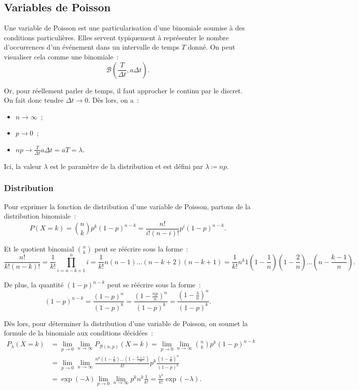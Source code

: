 \documentclass{article}
\begin{document}
	\subsection{Variables de Poisson}
		Une variable de Poisson est une particularisation d'une binomiale soumise à des conditions particulières. Elles servent typiquement à représenter le nombre
		d'occurrences d'un événement dans un intervalle de temps $T$ donné. On peut visualiser cela comme une binomiale~:
		\[\mathcal B(\frac T{\Delta t}, a\Delta t).\]

		Or, pour réellement parler de temps, il faut approcher le continu par le discret. On fait donc tendre $\Delta t \to 0$. Dès lors, on a~:
		\begin{itemize}
			\item $n \to \infty$~;
			\item $p \to 0$~;
			\item $np \to \frac T{\Delta t}a\Delta t = aT = \lambda$.
		\end{itemize}

		Ici, la valeur $\lambda$ est le paramètre de la distribution et est défini par $\lambda \coloneqq np$.

		\subsubsection{Distribution}
			Pour exprimer la fonction de distribution d'une variable de Poisson, partons de la distribution binomiale~:
			\[P(X=k) = \binom nkp^k(1-p)^{n-k} = \frac {n!}{i!(n-i)!}p^i(1-p)^{n-k}.\]

			Et le quotient binomial $\binom nk$ peut se réécrire sous la forme~:
			\[\frac {n!}{k!(n-k)!} = \frac 1{k!}\prod_{i=n-k+1}^ni = \frac 1{k!}n(n-1)\ldots(n-k+2)(n-k+1)
				= \frac 1{k!}n^k1(1-\frac 1n)(1-\frac 2n)\ldots(n-\frac {k-1}n).\]

			De plus, la quantité $(1-p)^{n-k}$ peut se réécrire sous la forme~:
			\[(1-p)^{n-k} = \frac {(1-p)^n}{(1-p)^k} = \frac {(1-\frac {np}n)^n}{(1-p)^k} = \frac {(1-\frac \lambda n)^n}{(1-p)^k}.\]

			Dès lors, pour déterminer la distribution d'une variable de Poisson, on soumet la formule de la binomiale aux conditions décidées~:
			\begin{align*}
				P_\lambda(X=k) &= \lim_{p \to 0}\lim_{n\to\infty}P_{\mathcal B(n, p)}(X=k) = \lim_{p \to 0}\lim_{n \to \infty}\binom nkp^k(1-p)^{n-k} \\
				&= \lim_{p \to 0}\lim_{n \to \infty}\frac {n^k(1-\frac 1n)\ldots(1-\frac {k+1}n)}{k!}p^k\frac {(1-\frac \lambda n)^n}{(1-p)^k} \\
				&= \exp(-\lambda)\lim_{p \to 0}\lim_{n \to \infty}p^kn^k\frac 1{k!} = \frac {\lambda^k}{k!}\exp(-\lambda).
			\end{align*}
\end{document}
